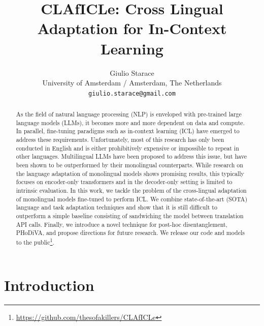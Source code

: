 \documentclass[11pt]{article}
\title{CLAfICLe: Cross Lingual Adaptation for In-Context Learning}
\author{Giulio Starace \\
  University of Amsterdam / Amsterdam, The Netherlands \\
  \texttt{giulio.starace@gmail.com} \\}
\begin{document}
\maketitle
\begin{abstract}
	As the field of natural language processing (NLP) is enveloped with pre-trained large
	language models (LLMs), it becomes more and more dependent on data and compute. In parallel,
	fine-tuning paradigms such as in-context learning (ICL) have emerged to address these
	requirements. Unfortunately, most of this research has only been conducted in English and is
	either prohibitively expensive or impossible to repeat in other languages. Multilingual LLMs have
	been proposed to address this issue, but have been shown to be outperformed by their monolingual
	counterparts. While research on the language adaptation of monolingual models shows promising
	results, this typically focuses on encoder-only transformers and in the decoder-only setting is
	limited to intrinsic evaluation. In this work, we tackle the problem of the cross-lingual
	adaptation of monolingual models fine-tuned to perform ICL. We combine state-of-the-art (SOTA)
	language and task adaptation techniques and show that it is still difficult to outperform a simple
	baseline consisting of sandwiching the model between translation API calls. Finally, we introduce
	a novel technique for post-hoc disentanglement, PHoDiVA, and propose directions for future
	research. We release our code and models to the
	public\footnote{\href{https://github.com/thesofakillers/CLAfICLe}{https://github.com/thesofakillers/CLAfICLe}}.

\end{abstract}
\section{Introduction}
\end{document}

